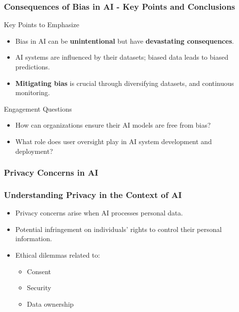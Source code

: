 \documentclass[aspectratio=169]{beamer}
\begin{document}
\begin{frame}[fragile]
    \frametitle{Consequences of Bias in AI - Key Points and Conclusions}
    \begin{block}{Key Points to Emphasize}
        \begin{itemize}
            \item Bias in AI can be \textbf{unintentional} but have \textbf{devastating consequences}.
            \item AI systems are influenced by their datasets; biased data leads to biased predictions.
            \item \textbf{Mitigating bias} is crucial through diversifying datasets, and continuous monitoring.
        \end{itemize}
    \end{block}
    \begin{block}{Engagement Questions}
        \begin{itemize}
            \item How can organizations ensure their AI models are free from bias?
            \item What role does user oversight play in AI system development and deployment?
        \end{itemize}
    \end{block}
\end{frame}

\begin{frame}[fragile]
  \frametitle{Privacy Concerns in AI}
\end{frame}

\begin{frame}[fragile]
  \frametitle{Understanding Privacy in the Context of AI}
  \begin{itemize}
    \item Privacy concerns arise when AI processes personal data.
    \item Potential infringement on individuals' rights to control their personal information.
    \item Ethical dilemmas related to:
    \begin{itemize}
      \item Consent
      \item Security
      \item Data ownership
    \end{itemize}
  \end{itemize}
\end{frame}
\end{document}
